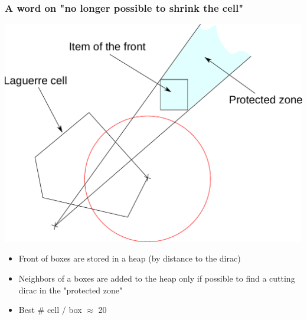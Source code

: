 \documentclass[aspectratio=169]{beamer}
\begin{document}
\begin{frame}
    \frametitle{A word on "no longer possible to shrink the cell"}

    \begin{minipage}[c][0.7\textheight][c]{0.6\textwidth}
        \begin{center}
            \includegraphics[width=\textwidth]{img/front.pdf}
        \end{center}
    \end{minipage}
    \textwidth
    \begin{minipage}[c][0.6\textheight][c]{0.35\textwidth}
        \begin{itemize}
            \item Front of boxes are stored in a heap (by distance to the dirac)
            \item Neighbors of a boxes are added to the heap only if possible to find a cutting dirac in the "protected zone"
        \end{itemize}

        \vfill
        \begin{itemize}
            \item Best $\#$ cell / box $\approx$ 20
        \end{itemize}
    \end{minipage}
\end{frame}
\end{document}
